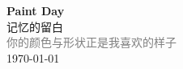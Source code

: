 \vspace*{\fill}
\begin{center}
    \textcolor{orange!50}{\Huge\textbf{Paint Day}} \\[1em]
    \textcolor{orange!60!pink}{\Large 记忆的留白} \\[2em]
    \textcolor{gray}{\large 你的颜色与形状正是我喜欢的样子} \\[1em]
    \today
\end{center}
\vspace*{\fill}
\clearpage


\clearpage

\clearpage

\clearpage
